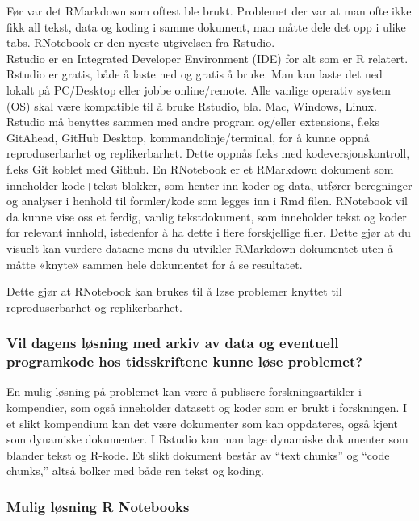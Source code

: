 \documentclass[
  12pt,
]{article}
\begin{document}
Før var det RMarkdown som oftest ble brukt. Problemet der var at man
ofte ikke fikk all tekst, data og koding i samme dokument, man måtte
dele det opp i ulike tabs. RNotebook er den nyeste utgivelsen fra
Rstudio.\\
Rstudio er en Integrated Developer Environment (IDE) for alt som er R
relatert. Rstudio er gratis, både å laste ned og gratis å bruke. Man kan
laste det ned lokalt på PC/Desktop eller jobbe online/remote. Alle
vanlige operativ system (OS) skal være kompatible til å bruke Rstudio,
bla. Mac, Windows, Linux. Rstudio må benyttes sammen med andre program
og/eller extensions, f.eks GitAhead, GitHub Desktop,
kommandolinje/terminal, for å kunne oppnå reproduserbarhet og
replikerbarhet. Dette oppnås f.eks med kodeversjonskontroll, f.eks Git
koblet med Github. En RNotebook er et RMarkdown dokument som inneholder
kode+tekst-blokker, som henter inn koder og data, utfører beregninger og
analyser i henhold til formler/kode som legges inn i Rmd filen.
RNotebook vil da kunne vise oss et ferdig, vanlig tekstdokument, som
inneholder tekst og koder for relevant innhold, istedenfor å ha dette i
flere forskjellige filer. Dette gjør at du visuelt kan vurdere dataene
mens du utvikler RMarkdown dokumentet uten å måtte «knyte» sammen hele
dokumentet for å se resultatet.

Dette gjør at RNotebook kan brukes til å løse problemer knyttet til
reproduserbarhet og replikerbarhet.

\hypertarget{vil-dagens-luxf8sning-med-arkiv-av-data-og-eventuell-programkode-hos-tidsskriftene-kunne-luxf8se-problemet}{%
\subsubsection{Vil dagens løsning med arkiv av data og eventuell
programkode hos tidsskriftene kunne løse
problemet?}\label{vil-dagens-luxf8sning-med-arkiv-av-data-og-eventuell-programkode-hos-tidsskriftene-kunne-luxf8se-problemet}}

En mulig løsning på problemet kan være å publisere forskningsartikler i
kompendier, som også inneholder datasett og koder som er brukt i
forskningen. I et slikt kompendium kan det være dokumenter som kan
oppdateres, også kjent som dynamiske dokumenter. I Rstudio kan man lage
dynamiske dokumenter som blander tekst og R-kode. Et slikt dokument
består av ``text chunks'' og ``code chunks,'' altså bolker med både ren
tekst og koding.

\hypertarget{mulig-luxf8sning-r-notebooks}{%
\subsubsection{Mulig løsning R
Notebooks}\label{mulig-luxf8sning-r-notebooks}}
\end{document}
